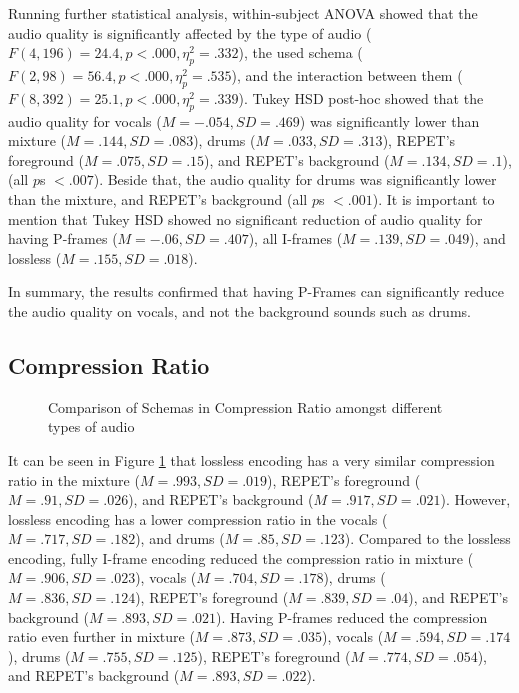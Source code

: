 Running further statistical analysis,  within-subject ANOVA showed that the audio quality is significantly affected by the type of audio  ($F(4,196)=24.4, p<.000, \eta_{p}^{2}=.332$), the used schema ($F(2,98)=56.4, p<.000, \eta_{p}^{2}=.535$), and the interaction between them ($F(8,392)=25.1, p<.000, \eta_{p}^{2}=.339$).
Tukey HSD post-hoc showed that the audio quality for vocals ($M=-.054, SD=.469$) was significantly lower than mixture ($M=.144, SD=.083$), drums ($M=.033, SD=.313$), REPET's foreground ($M=.075, SD=.15$), and REPET's background ($M=.134, SD=.1$), (all $p$s $<.007$).
Beside that, the audio quality for drums was significantly lower than the mixture, and REPET's background (all $p$s $<.001$).
It is important to mention that Tukey HSD showed no significant reduction of audio quality for having P-frames ($M=-.06, SD=.407$), all I-frames ($M=.139, SD=.049$), and lossless ($M=.155, SD=.018$).

In summary, the results confirmed that having P-Frames can significantly reduce the audio quality on vocals, and not the background sounds such as drums.

\subsection{Compression Ratio}

\begin{figure}[ht]
  
  \caption{Comparison of Schemas in Compression Ratio amongst different types of audio}
  \label{fig:input-compression}
\end{figure}

It can be seen in Figure \ref{fig:input-compression} that lossless encoding has a very similar compression ratio in the mixture ($M=.993, SD=.019$), REPET's foreground ($M=.91, SD=.026$), and REPET's background ($M=.917, SD=.021$).
However, lossless encoding has a lower compression ratio in the vocals ($M=.717, SD=.182$), and drums ($M=.85, SD=.123$).
Compared to the lossless encoding, fully I-frame encoding reduced the compression ratio in mixture ($M=.906, SD=.023$), vocals ($M=.704, SD=.178$), drums ($M=.836, SD=.124$), REPET's foreground ($M=.839, SD=.04$), and REPET's background ($M=.893, SD=.021$).
Having P-frames reduced the compression ratio even further in mixture ($M=.873, SD=.035$), vocals ($M=.594, SD=.174$), drums ($M=.755, SD=.125$), REPET's foreground ($M=.774, SD=.054$), and REPET's background ($M=.893, SD=.022$).

